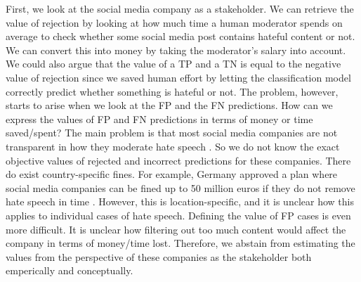 First, we look at the social media company as a stakeholder.
%
We can retrieve the value of rejection by looking at how much time a human moderator spends on average to check whether some social media post contains hateful content or not.
%
We can convert this into money by taking the moderator's salary into account.
%
We could also argue that the value of a TP and a TN is equal to the negative value of rejection since we saved human effort by letting the classification model correctly predict whether something is hateful or not.
%
The problem, however, starts to arise when we look at the FP and the FN predictions.
%
How can we express the values of FP and FN predictions in terms of money or time saved/spent?
%
The main problem is that most social media companies are not transparent in how they moderate hate speech \citep{klonick2017new}.
%
So we do not know the exact objective values of rejected and incorrect predictions for these companies.
%
There do exist country-specific fines.
%
For example, Germany approved a plan where social media companies can be fined up to 50 million euros if they do not remove hate speech in time \citep{bbc-firms-face-fine-germany}.
%
However, this is location-specific, and it is unclear how this applies to individual cases of hate speech.
%
Defining the value of FP cases is even more difficult.
%
It is unclear how filtering out too much content would affect the company in terms of money/time lost.
%
Therefore, we abstain from estimating the values from the perspective of these companies as the stakeholder both emperically and conceptually.

